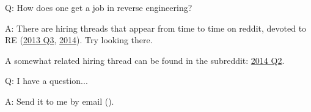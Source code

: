 \par Q: How does one get a job in reverse engineering?
\par A: There are hiring threads that appear from time to time on reddit, devoted to RE\FNURLREDDIT{}
(\href{http://go.yurichev.com/17333}{2013 Q3}, 
\href{http://go.yurichev.com/17334}{2014}).
Try looking there.

A somewhat related hiring thread can be found in the  subreddit:
\href{http://go.yurichev.com/17335}{2014 Q2}.

\par Q: I have a question...
\par A: Send it to me by email (\EMAIL).

